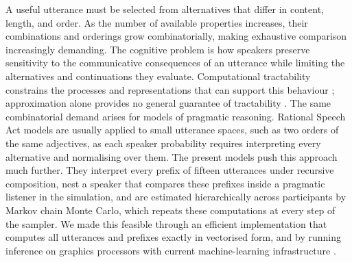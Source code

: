 \documentclass[10pt,a4paper,fleqn]{article}
\begin{document}
A useful utterance must be selected from alternatives that differ in content, length, and order.
As the number of available properties increases, their combinations and orderings grow combinatorially, making exhaustive comparison increasingly demanding.
The cognitive problem is how speakers preserve sensitivity to the communicative consequences of an utterance while limiting the alternatives and continuations they evaluate.
Computational tractability constrains the processes and representations that can support this behaviour \citep{vanrooij2008tractable}; approximation alone provides no general guarantee of tractability \citep{kwisthout2011bayesian}.
The same combinatorial demand arises for models of pragmatic reasoning.
Rational Speech Act models are usually applied to small utterance spaces, such as two orders of the same adjectives, as each speaker probability requires interpreting every alternative and normalising over them.
The present models push this approach much further.
They interpret every prefix of fifteen utterances under recursive composition, nest a speaker that compares these prefixes inside a pragmatic listener in the simulation, and are estimated hierarchically across participants by Markov chain Monte Carlo, which repeats these computations at every step of the sampler.
We made this feasible through an efficient implementation that computes all utterances and prefixes exactly in vectorised form, and by running inference on graphics processors with current machine-learning infrastructure \citep{jax2018github,phan2019composable}.
\end{document}

